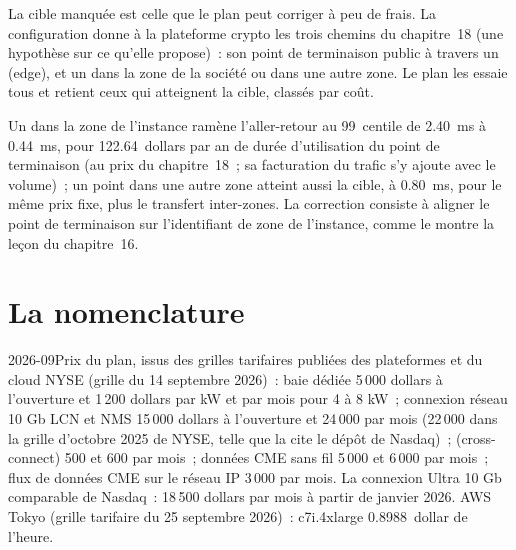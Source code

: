 La cible manquée est celle que le plan peut corriger à peu de frais. La configuration donne à la plateforme crypto les trois chemins du chapitre~18 (une
hypothèse sur ce qu'elle propose)~: son point de terminaison public à travers un  (edge), et un  dans la zone de la société ou dans une autre zone. Le plan les essaie tous et retient ceux qui atteignent la cible, classés par
coût.

\label{lst:nw:build-a-connectivity-plan:fix}

Un  dans la zone de l'instance ramène l'aller-retour au 99~centile de \qty{2.40}{\milli\second} à
\qty{0.44}{\milli\second}, pour 122.64~dollars par an de durée d'utilisation du point de terminaison (au prix du chapitre~18~; sa facturation du trafic s'y ajoute avec le volume)~;
un point dans une autre zone atteint aussi la cible, à \qty{0.80}{\milli\second}, pour le même prix fixe, plus le transfert inter-zones. La correction consiste à
aligner le point de terminaison sur l'identifiant de zone de l'instance, comme le montre la leçon du chapitre~16.

\section{La nomenclature}

\begin{dated}{2026-09}{Prix du plan, issus des grilles tarifaires publiées des plateformes et du cloud}\label{dat:nw:build-a-connectivity-plan:prices}
NYSE (grille du 14 septembre 2026)~: baie dédiée 5\,000 dollars à l'ouverture et 1\,200 dollars par kW et par mois pour 4 à 8 kW~; connexion réseau 10 Gb LCN et NMS
15\,000 dollars à l'ouverture et 24\,000 par mois (22\,000 dans la grille d'octobre 2025 de NYSE, telle que la cite le dépôt de Nasdaq)~; 
(cross-connect) 500 et 600 par mois~; données CME sans fil 5\,000 et 6\,000 par mois~; flux de données CME sur le réseau IP 3\,000 par mois. La
connexion Ultra 10 Gb comparable de Nasdaq~: 18\,500 dollars par mois à partir de janvier 2026. AWS Tokyo (grille tarifaire du 25 septembre 2026)~: c7i.4xlarge
0.8988~dollar de l'heure.
\end{dated}

